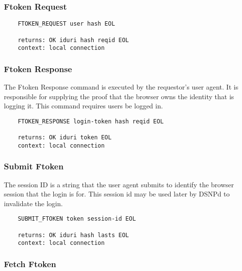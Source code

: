 \documentclass[letterpaper,11pt,oneside]{article}
\begin{document}
\subsubsection{Ftoken Request}

\vspace{10pt}
\begin{verbatim}
    FTOKEN_REQUEST user hash EOL 

    returns: OK iduri hash reqid EOL
    context: local connection
\end{verbatim}
\vspace{10pt}

\subsubsection{Ftoken Response}

The Ftoken Response command is executed by the requestor's user agent. It is
responsible for supplying the proof that the browser owns the identity that is
logging it. This command requires users be logged in.

\vspace{10pt}
\begin{verbatim}
    FTOKEN_RESPONSE login-token hash reqid EOL 

    returns: OK iduri token EOL
    context: local connection
\end{verbatim}
\vspace{10pt}

\subsubsection{Submit Ftoken}

The session ID is a string that the user agent submits to identify the browser
session that the login is for. This session id may be used later by DSNPd to
invalidate the login.

\vspace{10pt}
\begin{verbatim}
    SUBMIT_FTOKEN token session-id EOL 

    returns: OK iduri hash lasts EOL
    context: local connection
\end{verbatim}
\vspace{10pt}

\subsubsection{Fetch Ftoken}
\end{document}
